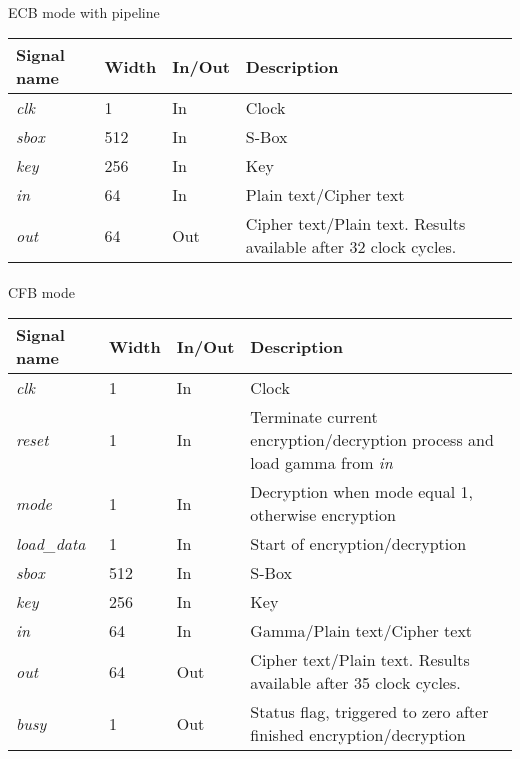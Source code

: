 \documentclass[a4paper,12pt]{article}
\begin{document}
\paragraph{}
ECB mode with pipeline\\
{\renewcommand{\arraystretch}{1.2}
\begin{tabularx}{\textwidth}{l|l l X}
\hline
Signal name & Width & In/Out & Description\\
\hline
\textsl{clk}        & 1   & In  & Clock\\
\textsl{sbox}       & 512 & In  & S-Box \\
\textsl{key}        & 256 & In  & Key \\
\textsl{in}         & 64  & In  & Plain text/Cipher text \\
\textsl{out}        & 64  & Out & Cipher text/Plain text. Results available after 32 clock cycles. \\
\hline
\end{tabularx}}

\paragraph{}
CFB mode\\
{\renewcommand{\arraystretch}{1.2}
\begin{tabularx}{\textwidth}{l|l l X}
\hline
Signal name & Width & In/Out & Description\\
\hline
\textsl{clk}        & 1   & In  & Clock\\
\textsl{reset}      & 1   & In  & Terminate current encryption/decryption process and load gamma from \textsl{in} \\
\textsl{mode}       & 1   & In  & Decryption when mode equal 1, otherwise encryption\\
\textsl{load\_data} & 1   & In  & Start of encryption/decryption \\
\textsl{sbox}       & 512 & In  & S-Box \\
\textsl{key}        & 256 & In  & Key \\
\textsl{in}         & 64  & In  & Gamma/Plain text/Cipher text \\
\textsl{out}        & 64  & Out & Cipher text/Plain text. Results available after 35 clock cycles. \\
\textsl{busy}       & 1   & Out & Status flag, triggered to zero after finished encryption/decryption \\
\hline
\end{tabularx}}
\end{document}
